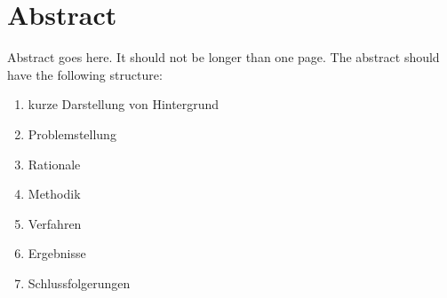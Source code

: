 \chapter*{Abstract}

Abstract goes here. It should not be longer than one page. The abstract should have the following structure:

\begin{enumerate}
    \item kurze Darstellung von Hintergrund
    \item Problemstellung
    \item Rationale
    \item Methodik
    \item Verfahren
    \item Ergebnisse
    \item Schlussfolgerungen
\end{enumerate}
